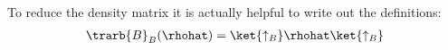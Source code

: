 To reduce the density matrix it is actually helpful to write out the definitions:
\begin{align}
\trarb{B}_B(\rhohat) = \ket{\uparrow_B}\rhohat\ket{\uparrow_B}
\end{align}